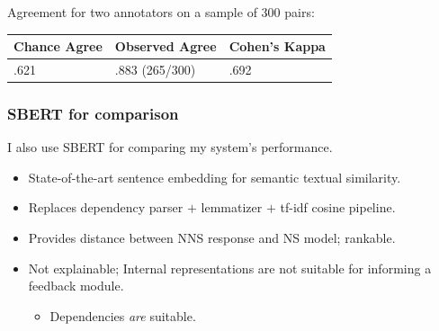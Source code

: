 \documentclass[xcolor={dvipsnames}]{beamer}
\newcommand{\param}[1]{\texttt{#1}}
\begin{document}
\begin{frame}
\pause
Agreement for two annotators on a sample of 300 pairs: \\

\begin{table}[htb!]
\begin{center}
\begin{tabular}{|l|l|l|}
\hline
 Chance Agree & Observed Agree & Cohen's Kappa \\
\hline
.621 & .883 (265/300) & .692 \\
\hline
\end{tabular}
\end{center}
\end{table}


\end{frame}

\begin{frame}
\frametitle{SBERT for comparison}
I also use SBERT for comparing my system's performance.
\vspace{.3em}
\begin{itemize}
\pause
\item State-of-the-art sentence embedding for semantic textual similarity.
\vspace{.3em}
\pause
\item Replaces dependency parser $+$ lemmatizer $+$ tf-idf cosine pipeline. 
\vspace{.3em}
\pause
\item Provides distance between NNS response and NS model; rankable.
\vspace{.3em}
\pause
\item Not explainable; Internal representations are not suitable for informing a feedback module.
\begin{itemize}
\vspace{.3em}
\pause
\item Dependencies \textit{are} suitable.
\end{itemize}
\end{itemize}
\end{frame}
\end{document}
